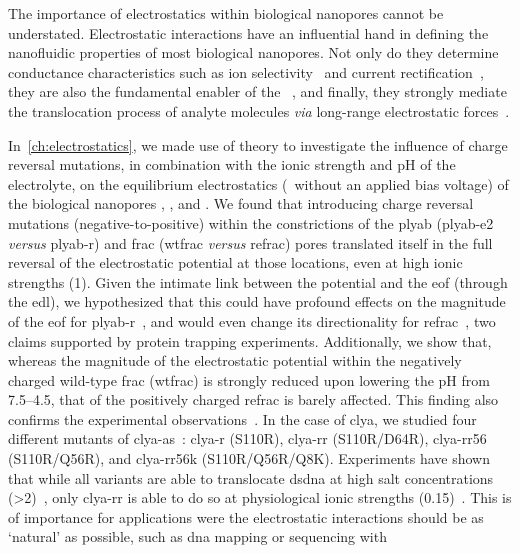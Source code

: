 The importance of electrostatics within biological nanopores cannot be understated. Electrostatic interactions
have an influential hand in defining the nanofluidic properties of most biological nanopores. Not only do they
determine conductance characteristics such as ion selectivity~\cite{Ramirez-2007} and current
rectification~\cite{Wang-2014}, they are also the fundamental enabler of the
~\cite{Bocquet-2010}, and finally, they strongly mediate the translocation process of analyte
molecules \textit{via} long-range electrostatic forces~\cite{Maglia-2008,Asandei-2015b,Fahie-2015b}.

In~\cref{ch:electrostatics}, we made use of  theory to investigate the influence of charge
reversal mutations, in combination with the ionic strength and pH of the electrolyte, on the equilibrium
electrostatics (\ie~without an applied bias voltage) of the biological nanopores ,
, and . We found that introducing charge reversal mutations
(negative-to-positive) within the constrictions of the \gls{plyab} (\gls{plyab-e2} \textit{versus}
\gls{plyab-r}) and \gls{frac} (\gls{wtfrac} \textit{versus} \gls{refrac}) pores translated itself in the full
reversal of the electrostatic potential at those locations, even at high ionic strengths (\SI{1}{\Molar}).
Given the intimate link between the potential and the \gls{eof} (through the \gls{edl}), we hypothesized that
this could have profound effects on the magnitude of the \gls{eof} for \gls{plyab-r}~\cite{Huang-2020}, and
would even change its directionality for \gls{refrac}~\cite{Huang-2017}, two claims supported by protein
trapping experiments. Additionally, we show that, whereas the magnitude of the electrostatic potential within
the negatively charged wild-type \gls{frac} (\gls{wtfrac}) is strongly reduced upon lowering the pH from
\numrange{7.5}{4.5}, that of the positively charged \gls{refrac} is barely affected. This finding also
confirms the experimental observations~\cite{Huang-2017}. In the case of \gls{clya}, we studied four different
mutants of \gls{clya-as}~\cite{Soskine-2013}: \gls{clya-r} (S110R), \gls{clya-rr} (S110R/D64R),
\gls{clya-rr56} (S110R/Q56R), and \gls{clya-rr56k} (S110R/Q56R/Q8K). Experiments have shown that while all
variants are able to translocate \gls{dsdna} at high salt concentrations
(\SI{>2}{\Molar})~\cite{Franceschini-2013}, only \gls{clya-rr} is able to do so at physiological ionic
strengths (\SI{0.15}{\Molar})~\cite{Franceschini-2016}. This is of importance for applications were the
electrostatic interactions should be as `natural' as possible, such as \gls{dna} mapping or sequencing with
